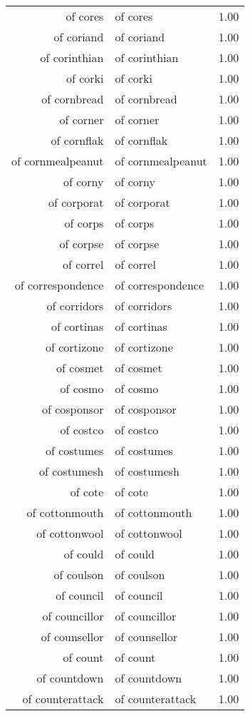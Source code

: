 \begin{table}[ht]
\begin{tabular}{rlr}
  of cores & of cores & 1.00 \\ 
  of coriand & of coriand & 1.00 \\ 
  of corinthian & of corinthian & 1.00 \\ 
  of corki & of corki & 1.00 \\ 
  of cornbread & of cornbread & 1.00 \\ 
  of corner & of corner & 1.00 \\ 
  of cornflak & of cornflak & 1.00 \\ 
  of cornmealpeanut & of cornmealpeanut & 1.00 \\ 
  of corny & of corny & 1.00 \\ 
  of corporat & of corporat & 1.00 \\ 
  of corps & of corps & 1.00 \\ 
  of corpse & of corpse & 1.00 \\ 
  of correl & of correl & 1.00 \\ 
  of correspondence & of correspondence & 1.00 \\ 
  of corridors & of corridors & 1.00 \\ 
  of cortinas & of cortinas & 1.00 \\ 
  of cortizone & of cortizone & 1.00 \\ 
  of cosmet & of cosmet & 1.00 \\ 
  of cosmo & of cosmo & 1.00 \\ 
  of cosponsor & of cosponsor & 1.00 \\ 
  of costco & of costco & 1.00 \\ 
  of costumes & of costumes & 1.00 \\ 
  of costumesh & of costumesh & 1.00 \\ 
  of cote & of cote & 1.00 \\ 
  of cottonmouth & of cottonmouth & 1.00 \\ 
  of cottonwool & of cottonwool & 1.00 \\ 
  of could & of could & 1.00 \\ 
  of coulson & of coulson & 1.00 \\ 
  of council & of council & 1.00 \\ 
  of councillor & of councillor & 1.00 \\ 
  of counsellor & of counsellor & 1.00 \\ 
  of count & of count & 1.00 \\ 
  of countdown & of countdown & 1.00 \\ 
  of counterattack & of counterattack & 1.00 \\ 

\end{tabular}
\end{table}
